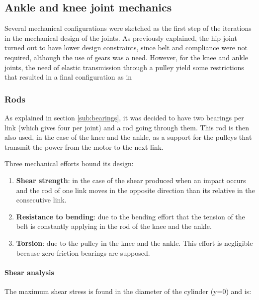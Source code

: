 
\subsection{Ankle and knee joint mechanics} %
\label{sub:hip_and_knee_joint_mechanics}
Several mechanical configurations were sketched as the first step of the iterations in the mechanical design of the joints.
As previously explained, the hip joint turned out to have lower design constraints, since belt and compliance were not required, although the use of gears was a need.
However, for the knee and ankle joints, the need of elastic transmission through a pulley yield some restrictions that resulted in a final configuration as in 

\subsubsection{Rods} %
\label{ssub:rods}
As explained in section \ref{sub:bearings}, it was decided to have two bearings per link (which gives four per joint) and a rod going through them.
This rod is then also used, in the case of the knee and the ankle, as a support for the pulleys that transmit the power from the motor to the next link.

Three mechanical efforts bound its design:
\begin{enumerate}
  \item \textbf{Shear strength}: in the case of the shear produced when an impact occurs and the rod of one link moves in the opposite direction than its relative in the consecutive link.
  \item \textbf{Resistance to bending}: due to the bending effort that the tension of the belt is constantly applying in the rod of the  knee and the ankle.
  \item \textbf{Torsion}: due to the pulley in the knee and the ankle. 
  This effort is negligible because zero-friction bearings are supposed.
\end{enumerate}

  \paragraph{Shear analysis} %
  \label{ssub:shear_analysis}
  The maximum shear stress is found in the diameter of the cylinder (y=0) and is:
  
